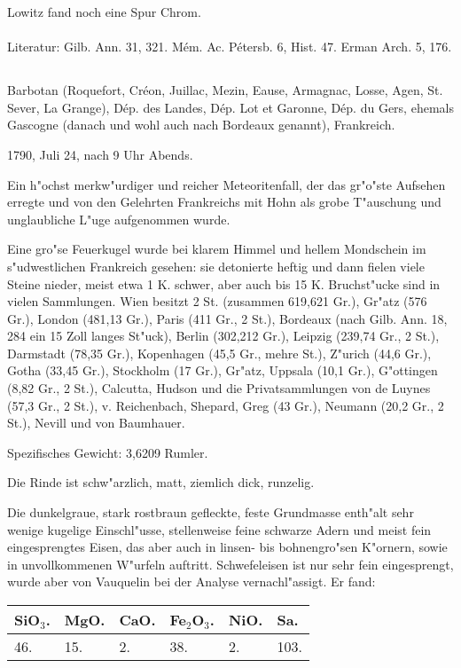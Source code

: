 \documentclass[a4paper, 11pt, oneside]{article}
\begin{document}
Lowitz fand noch eine Spur Chrom.
\normalsize
\paragraph{}
Literatur: Gilb. Ann. 31, 321. Mém. Ac. Pétersb. 6, Hist. 47. Erman Arch. 5, 176.
\subsection{}
\LARGE
\paragraph{}
Barbotan (Roquefort, Créon, Juillac, Mezin, Eause, Armagnac, Losse, Agen, St. Sever, La Grange), Dép. des Landes, Dép. Lot et Garonne, Dép. du Gers, ehemals Gascogne (danach und wohl auch nach Bordeaux genannt), Frankreich.

1790, Juli 24, nach 9 Uhr Abends.

Ein h"ochst merkw"urdiger und reicher Meteoritenfall, der das gr"o"ste Aufsehen erregte und von den Gelehrten Frankreichs mit Hohn als grobe T"auschung und unglaubliche L"uge aufgenommen wurde.

Eine gro"se Feuerkugel wurde bei klarem Himmel und hellem Mondschein im s"udwestlichen Frankreich gesehen: sie detonierte heftig und dann fielen viele Steine nieder, meist etwa 1 K. schwer, aber auch bis 15 K. Bruchst"ucke sind in vielen Sammlungen. Wien besitzt 2 St. (zusammen 619,621 Gr.), Gr"atz (576 Gr.), London (481,13 Gr.), Paris (411 Gr., 2 St.), Bordeaux (nach Gilb. Ann. 18, 284 ein 15 Zoll langes St"uck), Berlin (302,212 Gr.), Leipzig (239,74 Gr., 2 St.), Darmstadt (78,35 Gr.), Kopenhagen (45,5 Gr., mehre St.), Z"urich (44,6 Gr.), Gotha (33,45 Gr.), Stockholm (17 Gr.), Gr"atz, Uppsala (10,1 Gr.), G"ottingen (8,82 Gr., 2 St.), Calcutta, Hudson und die Privatsammlungen von de Luynes (57,3 Gr., 2 St.), v. Reichenbach, Shepard, Greg (43 Gr.), Neumann (20,2 Gr., 2 St.), Nevill und von Baumhauer.

Spezifisches Gewicht: 3,6209 Rumler.

Die Rinde ist schw"arzlich, matt, ziemlich dick, runzelig.

Die dunkelgraue, stark rostbraun gefleckte, feste Grundmasse enth"alt sehr wenige kugelige Einschl"usse, stellenweise feine schwarze Adern und meist fein eingesprengtes Eisen, das aber auch in linsen- bis bohnengro"sen K"ornern, sowie in unvollkommenen W"urfeln auftritt. Schwefeleisen ist nur sehr fein eingesprengt, wurde aber von Vauquelin bei der Analyse vernachl"assigt. Er fand:
\begin{table}[!ht]
    \centering\swabfamily\Large
    \begin{tabular}{l l l l l l}
        SiO$_{3}$. & MgO. & CaO. & Fe$_{2}$O$_{3}$. & NiO. & Sa. \\ \hline
        46. & 15. & 2. & 38. & 2. & 103. \\
    \end{tabular}
\end{table}
\end{document}
